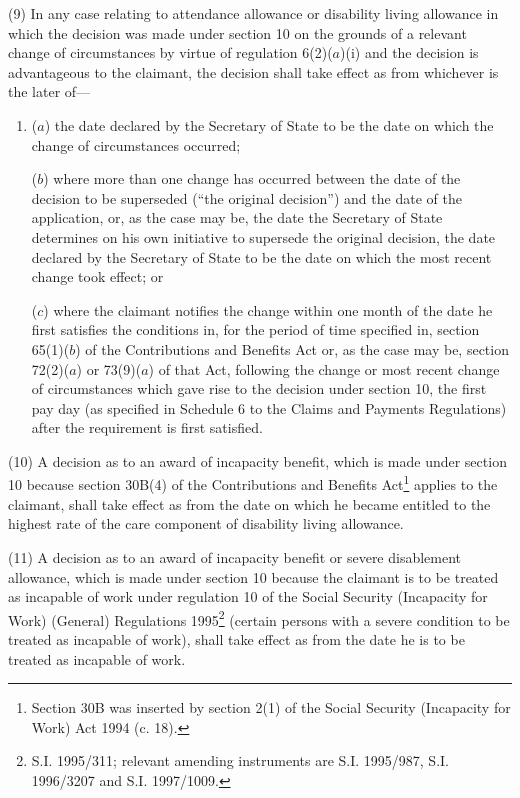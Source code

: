 \documentclass[12pt,a4paper]{article}
\begin{document}
(9) In any case relating to attendance allowance or disability living allowance in which the decision was made under section 10 on the grounds of a relevant change of circumstances by virtue of regulation 6(2)($a$)(i) and the decision is advantageous to the claimant, the decision shall take effect as from whichever is the later of—
\begin{enumerate}\item[]
($a$) the date declared by the Secretary of State to be the date on which the change of circumstances occurred;

($b$) where more than one change has occurred between the date of the decision to be superseded (“the original decision”) and the date of the application, or, as the case may be, the date the Secretary of State determines on his own initiative to supersede the original decision, the date declared by the Secretary of State to be the date on which the most recent change took effect; or

($c$) where the claimant notifies the change within one month of the date he first satisfies the conditions in, for the period of time specified in, section 65(1)($b$) of the Contributions and Benefits Act or, as the case may be, section 72(2)($a$) or 73(9)($a$) of that Act, following the change or most recent change of circumstances which gave rise to the decision under section 10, the first pay day (as specified in Schedule 6 to the Claims and Payments Regulations) after the requirement is first satisfied.
\end{enumerate}

(10) A decision as to an award of incapacity benefit, which is made under section 10 because section 30B(4) of the Contributions and Benefits Act\footnote{\frenchspacing Section 30B was inserted by section 2(1) of the Social Security (Incapacity for Work) Act 1994 (c. 18).} applies to the claimant, shall take effect as from the date on which he became entitled to the highest rate of the care component of disability living allowance.

(11) A decision as to an award of incapacity benefit or severe disablement allowance, which is made under section 10 because the claimant is to be treated as incapable of work under regulation 10 of the Social Security (Incapacity for Work) (General) Regulations 1995\footnote{\frenchspacing S.I. 1995/311; relevant amending instruments are S.I. 1995/987, S.I. 1996/3207 and S.I. 1997/1009.} (certain persons with a severe condition to be treated as incapable of work), shall take effect as from the date he is to be treated as incapable of work.
\end{document}
